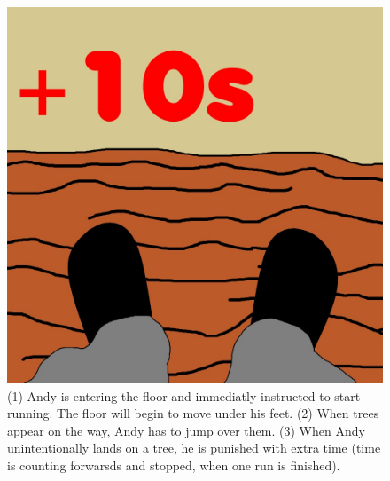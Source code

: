 \documentclass[twocolumn,showpacs,%
  nofootinbib,aps,superscriptaddress,%
  eqsecnum,prd,notitlepage,showkeys,10pt]{revtex4-1}
\begin{document}
\begin{figure}[!htb]
\endminipage\hfill
{}%
  \includegraphics[width=\linewidth]{graphics/Image(6).jpg}
\endminipage
  \caption{(1) Andy is entering the floor and immediatly instructed to start running. The floor will begin to move under his feet. (2) When trees appear on the way, Andy has to jump over them. (3) When Andy unintentionally lands on a tree, he is punished with extra time (time is counting forwarsds and stopped, when one run is finished).}\label{fig:awesome_image3}
\end{figure}
\end{document}
